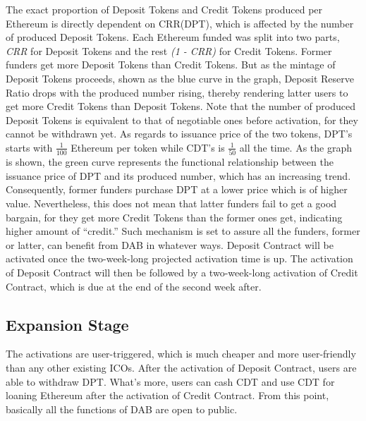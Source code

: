 \documentclass[review]{elsarticle}
\begin{document}
The exact proportion of Deposit Tokens and Credit Tokens produced per Ethereum is directly dependent on CRR(DPT), which is affected by the number of produced Deposit Tokens. Each Ethereum funded was split into two parts, \emph{CRR} for Deposit Tokens and the rest \emph{(1 - CRR)} for Credit Tokens. Former funders get more Deposit Tokens than Credit Tokens. But as the mintage of Deposit Tokens proceeds, shown as the blue curve in the graph, Deposit Reserve Ratio drops with the produced number rising, thereby rendering latter users to get more Credit Tokens than Deposit Tokens. Note that the number of produced Deposit Tokens is equivalent to that of negotiable ones before activation, for they cannot be withdrawn yet.
As regards to issuance price of the two tokens, DPT's starts with ${\frac{1}{100}}$ Ethereum per token while CDT's is ${\frac{1}{50}}$ all the time. As the graph is shown, the green curve represents the functional relationship between the issuance price of DPT and its produced number, which has an increasing trend. Consequently, former funders purchase DPT at a lower price which is of higher value.
Nevertheless, this does not mean that latter funders fail to get a good bargain, for they get more Credit Tokens than the former ones get, indicating higher amount of ``credit.''  Such mechanism is set to assure all the funders, former or latter, can benefit from DAB in whatever ways.
Deposit Contract will be activated once the two-week-long projected activation time is up. The activation of Deposit Contract will then be followed by a two-week-long activation of Credit Contract, which is due at the end of the second week after.

\subsection{Expansion Stage}
The activations are user-triggered, which is much cheaper and more user-friendly than any other existing ICOs. After the activation of Deposit Contract, users are able to withdraw DPT. What's more, users can cash CDT and use CDT for loaning Ethereum after the activation of Credit Contract. From this point, basically all the functions of DAB are open to public.
\end{document}
